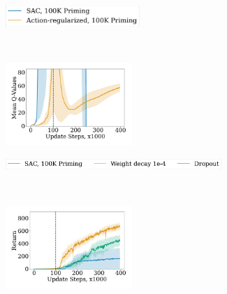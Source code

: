 \begin{figure}[H]
\begin{minipage}[b]{.35\textwidth}
\centering
    \begin{subfigure}[b]{\textwidth}
        \centering
        \includegraphics[height=0.8cm]{figures/dissecting/priming/elu_priming_causes_return_legend.pdf}
    \end{subfigure}\\%
    \begin{subfigure}[b]{\textwidth}
        \centering
        \includegraphics[width=4.8cm, trim=1cm 1cm 1cm 1cm ,clip]{figures/dissecting/priming/elu_priming_causes_Q.pdf}
        \label{subfig:elu_priming_causes_Q}
    \end{subfigure}%
    \vspace{-5pt}
    \caption{ELU activations. Priming with SAC and action regularization during priming. The latter lowers divergence. }
    \label{fig:elu_priming_causes}
\end{minipage}
\hfill
\begin{minipage}[b]{.62\textwidth}
    \centering
    \begin{subfigure}[b]{0.8\textwidth}
        \centering
        \includegraphics[height=0.4cm]{figures/dissecting/priming/elu_priming_ablations_return_legend.pdf}
    \end{subfigure}\\%
    \begin{subfigure}[b]{0.5\textwidth}
        \centering
        \includegraphics[width=4.8cm, trim=1cm 1cm 1cm 1cm ,clip]{figures/dissecting/priming/elu_priming_ablations_return.pdf}

\end{subfigure}
\end{minipage}
\end{figure}
